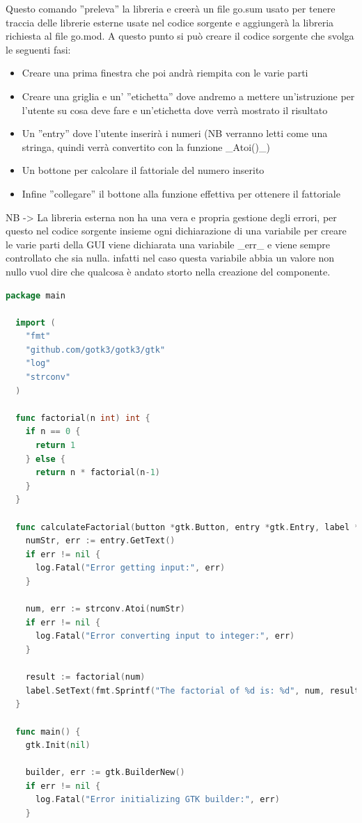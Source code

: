 \begin{itemize}
Questo comando ''preleva'' la libreria e creerà un file go.sum usato per tenere traccia delle librerie esterne usate nel codice sorgente e aggiungerà la libreria richiesta al file go.mod. 
A questo punto si può creare il codice sorgente che svolga  le seguenti fasi:
\begin{itemize}
\item Creare una prima finestra che poi andrà riempita con le varie parti
\item Creare una griglia e un' ''etichetta'' dove andremo a mettere un'istruzione per l'utente su cosa deve fare e un'etichetta dove verrà mostrato il risultato
\item Un ''entry'' dove l'utente inserirà i numeri (NB  verranno letti come una stringa, quindi verrà convertito con la funzione _Atoi()_)
\item Un bottone per calcolare il fattoriale del numero inserito
\item Infine ''collegare'' il bottone alla funzione effettiva per ottenere il fattoriale
\end{itemize}
NB -> La libreria esterna non ha una vera e propria gestione degli errori, per questo nel codice sorgente insieme ogni dichiarazione di una variabile per creare le varie parti della GUI viene dichiarata una variabile _err_ e viene sempre controllato che sia nulla. infatti nel caso questa variabile abbia un valore non nullo vuol dire che qualcosa è andato storto nella creazione del componente.
\begin{lstlisting}[language=Go]
  package main
  
  import (
    "fmt"
    "github.com/gotk3/gotk3/gtk"
    "log"
    "strconv"
  )
  
  func factorial(n int) int {
    if n == 0 {
      return 1
    } else {
      return n * factorial(n-1)
    }
  }
  
  func calculateFactorial(button *gtk.Button, entry *gtk.Entry, label *gtk.Label) {
    numStr, err := entry.GetText()
    if err != nil {
      log.Fatal("Error getting input:", err)
    }
  
    num, err := strconv.Atoi(numStr)
    if err != nil {
      log.Fatal("Error converting input to integer:", err)
    }
  
    result := factorial(num)
    label.SetText(fmt.Sprintf("The factorial of %d is: %d", num, result))
  }
  
  func main() {
    gtk.Init(nil)
  
    builder, err := gtk.BuilderNew()
    if err != nil {
      log.Fatal("Error initializing GTK builder:", err)
    }
  

\end{lstlisting}
\end{itemize}
